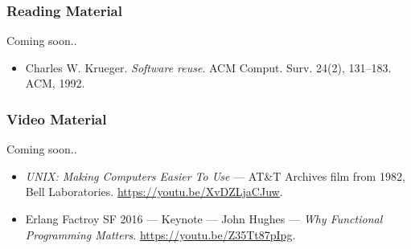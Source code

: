 \begin{frame}

\frametitle{Reading Material}

\begin{center}

Coming soon..

\end{center}

\footnotesize

\begin{itemize}

\item Charles W. Krueger. \emph{Software reuse}. ACM Comput. Surv. 24(2),
131--183. ACM, 1992.

\end{itemize}

\end{frame}


\begin{frame}

\frametitle{Video Material}

\begin{center}

Coming soon..

\end{center}

\footnotesize

\begin{itemize}

\item \emph{UNIX: Making Computers Easier To Use} --- AT\&T Archives film from
1982, Bell Laboratories. \url{https://youtu.be/XvDZLjaCJuw}.

\item Erlang Factroy SF 2016 --- Keynote --- John Hughes --- \emph{Why
Functional Programming Matters}. \url{https://youtu.be/Z35Tt87pIpg}.

\end{itemize}

\end{frame}
